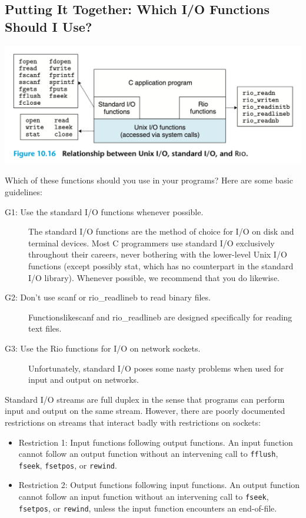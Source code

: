 \documentclass[11pt]{article}
\begin{document}
\subsection{Putting It Together: Which I/O Functions Should I Use?}
\label{sec:org1efa651}

\begin{center}
\includegraphics[width=.9\linewidth]{pics/figure10.16-relationship-between-unix-io-standard-io-and-rio.png}
\end{center}

Which of these functions should you use in your programs? Here are some basic guidelines:\\
\begin{description}
\item[{G1: Use the standard I/O functions whenever possible.}] The standard I/O functions are the method of choice for I/O on disk and terminal devices. Most C programmers use standard I/O exclusively throughout their careers, never bothering with the lower-level Unix I/O functions (except possibly stat, which has no counterpart in the standard I/O library). Whenever possible, we recommend that you do likewise.\\
\item[{G2: Don't use scanf or rio\_readlineb to read binary files.}] Functionslikescanf and rio\_readlineb are designed specifically for reading text files.\\
\item[{G3: Use the Rio functions for I/O on network sockets.}] Unfortunately, standard I/O poses some nasty problems when used for input and output on networks.\\
\end{description}

Standard I/O streams are full duplex in the sense that programs can perform input and output on the same stream. However, there are poorly documented restrictions on streams that interact badly with restrictions on sockets:\\
\begin{itemize}
\item Restriction 1: Input functions following output functions. An input function cannot follow an output function without an intervening call to \texttt{fflush}, \texttt{fseek}, \texttt{fsetpos}, or \texttt{rewind}.\\
\item Restriction 2: Output functions following input functions. An output function cannot follow an input function without an intervening call to \texttt{fseek}, \texttt{fsetpos}, or \texttt{rewind}, unless the input function encounters an end-of-file.\\
\end{itemize}
\end{document}
